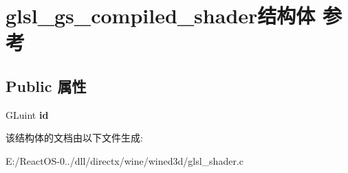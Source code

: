 \hypertarget{structglsl__gs__compiled__shader}{}\section{glsl\+\_\+gs\+\_\+compiled\+\_\+shader结构体 参考}
\label{structglsl__gs__compiled__shader}
\subsection*{Public 属性}
\begin{DoxyCompactItemize}
\item 
\mbox{\label{structglsl__gs__compiled__shader_a64081b7609c2411609594b3c439e0b88}} 
G\+Luint {\bfseries id}
\end{DoxyCompactItemize}


该结构体的文档由以下文件生成\+:\begin{DoxyCompactItemize}
\item 
E\+:/\+React\+O\+S-\/0../dll/directx/wine/wined3d/glsl\+\_\+shader.\+c\end{DoxyCompactItemize}
